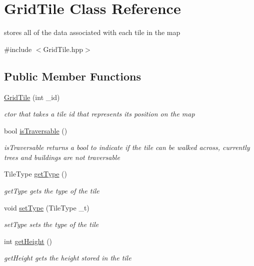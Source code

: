 \hypertarget{class_grid_tile}{}\section{Grid\+Tile Class Reference}
\label{class_grid_tile}


stores all of the data associated with each tile in the map  




{\ttfamily \#include $<$Grid\+Tile.\+hpp$>$}

\subsection*{Public Member Functions}
\begin{DoxyCompactItemize}
\item 
\hyperlink{class_grid_tile_a6ba79edb185d1e6a5d7d9fe01c36ffd8}{Grid\+Tile} (int \+\_\+id)
\begin{DoxyCompactList}\small\item\em ctor that takes a tile id that represents its position on the map \end{DoxyCompactList}\item 
bool \hyperlink{class_grid_tile_a2aad8cf6129ba54b034b64e2831777c5}{is\+Traversable} ()
\begin{DoxyCompactList}\small\item\em is\+Traversable returns a bool to indicate if the tile can be walked across, currently trees and buildings are not traversable \end{DoxyCompactList}\item 
Tile\+Type \hyperlink{class_grid_tile_ad3ad533f3fecb500ca598863388a8e1f}{get\+Type} ()
\begin{DoxyCompactList}\small\item\em get\+Type gets the type of the tile \end{DoxyCompactList}\item 
void \hyperlink{class_grid_tile_a85f7230f5cc42c6b7e878f2d32c965d4}{set\+Type} (Tile\+Type \+\_\+t)
\begin{DoxyCompactList}\small\item\em set\+Type sets the type of the tile \end{DoxyCompactList}\item 
int \hyperlink{class_grid_tile_a04d62e39a1ccf3ce7e073363713041a2}{get\+Height} ()
\begin{DoxyCompactList}\small\item\em get\+Height gets the height stored in the tile \end{DoxyCompactList}\item 

\end{DoxyCompactItemize}
